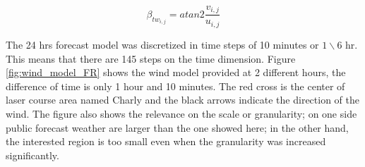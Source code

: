 \begin{equation}\label{eq:b_tw}
    \beta_{tw_{i,j}}= atan2 \frac {v_{i,j}}{u_{i,j}}
\end{equation}

The 24 hrs forecast model was discretized in time steps of 10 minutes or ${1} \backslash {6}$ hr. This means that there are 145 steps on the time dimension. Figure \ref{fig:wind_model_FR} shows the wind model provided at 2 different hours, the difference of time is only 1 hour and 10 minutes. The red cross is the center of laser course area named Charly and the black arrows indicate the direction of the wind. The figure also shows the relevance on the scale or granularity; on one side public forecast weather are larger than the one showed here; in the other hand, the interested region is too small even when the granularity was increased significantly. \par    

